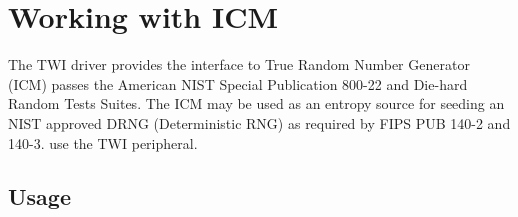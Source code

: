 \hypertarget{group__icm__module}{}\section{Working with I\+CM}
\label{group__icm__module}
The T\+WI driver provides the interface to True Random Number Generator (I\+CM) passes the American N\+I\+ST Special Publication 800-\/22 and Die-\/hard Random Tests Suites. The I\+CM may be used as an entropy source for seeding an N\+I\+ST approved D\+R\+NG (Deterministic R\+NG) as required by F\+I\+PS P\+UB 140-\/2 and 140-\/3. use the T\+WI peripheral.\hypertarget{group__RTEMSBSPsARM_Usage}{}\subsection{Usage}\label{group__RTEMSBSPsARM_Usage}

